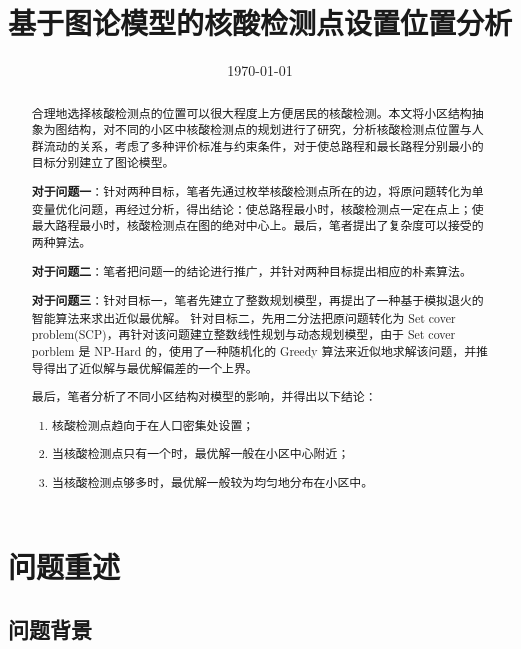\documentclass{cumcmthesis}
\title{基于图论模型的核酸检测点设置位置分析}
\date{\today}
\begin{document}
\maketitle

\begin{abstract}

合理地选择核酸检测点的位置可以很大程度上方便居民的核酸检测。本文将小区结构抽象为图结构，对不同的小区中核酸检测点的规划进行了研究，分析核酸检测点位置与人群流动的关系，考虑了多种评价标准与约束条件，对于使总路程和最长路程分别最小的目标分别建立了图论模型。

\textbf{对于问题一}：针对两种目标，笔者先通过枚举核酸检测点所在的边，将原问题转化为单变量优化问题，再经过分析，得出结论：使总路程最小时，核酸检测点一定在点上；使最大路程最小时，核酸检测点在图的绝对中心上。最后，笔者提出了复杂度可以接受的两种算法。

\textbf{对于问题二}：笔者把问题一的结论进行推广，并针对两种目标提出相应的朴素算法。

\textbf{对于问题三}：针对目标一，笔者先建立了整数规划模型，再提出了一种基于模拟退火的智能算法来求出近似最优解。
针对目标二，先用二分法把原问题转化为 Set cover problem(SCP)，再针对该问题建立整数线性规划与动态规划模型，由于 Set cover porblem 是 NP-Hard 的，使用了一种随机化的 Greedy 算法来近似地求解该问题，并推导得出了近似解与最优解偏差的一个上界。

最后，笔者分析了不同小区结构对模型的影响，并得出以下结论：

\begin{enumerate}
    \item 核酸检测点趋向于在人口密集处设置；
    \item 当核酸检测点只有一个时，最优解一般在小区中心附近；
    \item 当核酸检测点够多时，最优解一般较为均匀地分布在小区中。
\end{enumerate}



\end{abstract}


\section{问题重述}

\subsection{问题背景}
\end{document}
